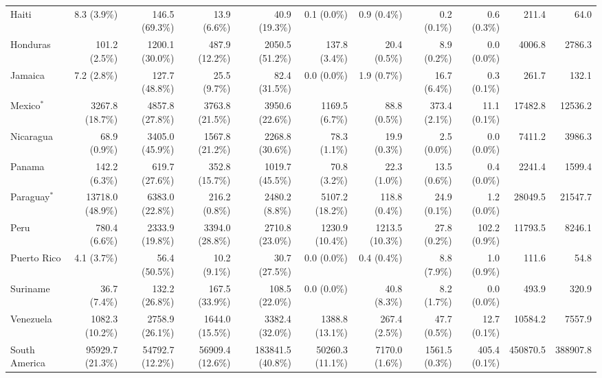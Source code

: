 \begin{scriptsize}
\begin{landscape}
\begin{center}
\begin{longtable}[ht]{lrrrrrrrrrr}
			Haiti&8.3 (3.9\%)&146.5 (69.3\%)&13.9 (6.6\%)&40.9 (19.3\%)&0.1 (0.0\%)&0.9 (0.4\%)&0.2 (0.1\%)&0.6 (0.3\%)&211.4&64.0\\
			Honduras&101.2 (2.5\%)&1200.1 (30.0\%)&487.9 (12.2\%)&2050.5 (51.2\%)&137.8 (3.4\%)&20.4 (0.5\%)&8.9 (0.2\%)&0.0 (0.0\%)&4006.8&2786.3\\
			Jamaica&7.2 (2.8\%)&127.7 (48.8\%)&25.5 (9.7\%)&82.4 (31.5\%)&0.0 (0.0\%)&1.9 (0.7\%)&16.7 (6.4\%)&0.3 (0.1\%)&261.7&132.1\\
			Mexico$^*$&3267.8 (18.7\%)&4857.8 (27.8\%)&3763.8 (21.5\%)&3950.6 (22.6\%)&1169.5 (6.7\%)&88.8 (0.5\%)&373.4 (2.1\%)&11.1 (0.1\%)&17482.8&12536.2\\
			Nicaragua&68.9 (0.9\%)&3405.0 (45.9\%)&1567.8 (21.2\%)&2268.8 (30.6\%)&78.3 (1.1\%)&19.9 (0.3\%)&2.5 (0.0\%)&0.0 (0.0\%)&7411.2&3986.3\\
			Panama&142.2 (6.3\%)&619.7 (27.6\%)&352.8 (15.7\%)&1019.7 (45.5\%)&70.8 (3.2\%)&22.3 (1.0\%)&13.5 (0.6\%)&0.4 (0.0\%)&2241.4&1599.4\\
			Paraguay$^*$&13718.0 (48.9\%)&6383.0 (22.8\%)&216.2 (0.8\%)&2480.2 (8.8\%)&5107.2 (18.2\%)&118.8 (0.4\%)&24.9 (0.1\%)&1.2 (0.0\%)&28049.5&21547.7\\
			Peru&780.4 (6.6\%)&2333.9 (19.8\%)&3394.0 (28.8\%)&2710.8 (23.0\%)&1230.9 (10.4\%)&1213.5 (10.3\%)&27.8 (0.2\%)&102.2 (0.9\%)&11793.5&8246.1\\
			Puerto Rico&4.1 (3.7\%)&56.4 (50.5\%)&10.2 (9.1\%)&30.7 (27.5\%)&0.0 (0.0\%)&0.4 (0.4\%)&8.8 (7.9\%)&1.0 (0.9\%)&111.6&54.8\\
			Suriname&36.7 (7.4\%)&132.2 (26.8\%)&167.5 (33.9\%)&108.5 (22.0\%)&0.0 (0.0\%)&40.8 (8.3\%)&8.2 (1.7\%)&0.0 (0.0\%)&493.9&320.9\\
			Venezuela&1082.3 (10.2\%)&2758.9 (26.1\%)&1644.0 (15.5\%)&3382.4 (32.0\%)&1388.8 (13.1\%)&267.4 (2.5\%)&47.7 (0.5\%)&12.7 (0.1\%)&10584.2&7557.9\\\hline
			South America&95929.7 (21.3\%)&54792.7 (12.2\%)&56909.4 (12.6\%)&183841.5 (40.8\%)&50260.3 (11.1\%)&7170.0 (1.6\%)&1561.5 (0.3\%)&405.4 (0.1\%)&450870.5&388907.8\\\hline


\end{longtable}
\end{center}
\end{landscape}
\end{scriptsize}
